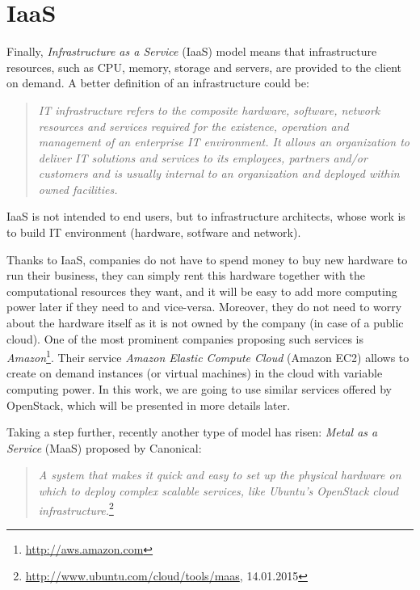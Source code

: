 \section{IaaS}
Finally, \textit{Infrastructure as a Service} (IaaS) model means that infrastructure resources, such as CPU, memory, storage and servers, are provided to the client on demand. A better definition of an infrastructure could be:
\begin{quotation}
\textit{
IT infrastructure refers to the composite hardware, software, network resources and services required for the existence, operation and management of an enterprise IT environment. It allows an organization to deliver IT solutions and services to its employees, partners and/or customers and is usually internal to an organization and deployed within owned facilities.
}\cite{cjanssen14}
\end{quotation}

IaaS is not intended to end users, but to infrastructure architects, whose work is to build IT environment (hardware, sotfware and network).

Thanks to IaaS, companies do not have to spend money to buy new hardware to run their business, they can simply rent this hardware together with the computational resources they want, and it will be easy to add more computing power later if they need to and vice-versa. 
Moreover, they do not need to worry about the hardware itself as it is not owned by the company (in case of a public cloud). 
One of the most prominent companies proposing such services is \textit{Amazon}\footnote{\url{http://aws.amazon.com}}. 
Their service \textit{Amazon Elastic Compute Cloud} (Amazon EC2) allows to create on demand instances (or virtual machines) in the cloud with variable computing power. 
In this work, we are going to use similar services offered by OpenStack, which will be presented in more details later.

Taking a step further, recently another type of model has risen: \textit{Metal as a Service} (MaaS) proposed by Canonical:
\begin{quotation}
\textit{A system that makes it quick and easy to set up the physical hardware on which to deploy complex scalable services, like Ubuntu’s OpenStack cloud infrastructure.}\footnote{\url{http://www.ubuntu.com/cloud/tools/maas}, 14.01.2015}
\end{quotation}

